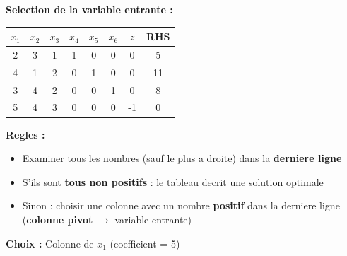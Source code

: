 \documentclass[12pt,a4paper]{article}
\begin{document}
\begin{methode}
\textbf{Selection de la variable entrante :}

\begin{center}
\begin{tabular}{ccccccc|c}
\toprule
$x_1$ & $x_2$ & $x_3$ & $x_4$ & $x_5$ & $x_6$ & $z$ & RHS \\
\midrule
2 & 3 & 1 & 1 & 0 & 0 & 0 & 5 \\
4 & 1 & 2 & 0 & 1 & 0 & 0 & 11 \\
3 & 4 & 2 & 0 & 0 & 1 & 0 & 8 \\
\midrule
\textcolor{defvert}{5} & \textcolor{defvert}{4} & \textcolor{defvert}{3} & 0 & 0 & 0 & -1 & 0 \\
\bottomrule
\end{tabular}
\end{center}

\textbf{Regles :}
\begin{itemize}
    \item Examiner tous les nombres (sauf le plus a droite) dans la \textcolor{algoviolet}{\textbf{derniere ligne}}
    \item S'ils sont \textcolor{defvert}{\textbf{tous non positifs}} : le tableau decrit une solution optimale
    \item Sinon : choisir une colonne avec un nombre \textcolor{titrebleu}{\textbf{positif}} dans la derniere ligne (\textcolor{importantrouge}{\textbf{colonne pivot}} $\to$ variable entrante)
\end{itemize}

\textbf{Choix :} Colonne de $x_1$ (coefficient = 5)
\end{methode}
\end{document}
